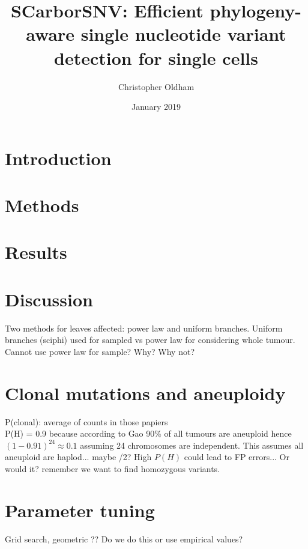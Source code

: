 \documentclass{article}
\title{SCarborSNV: Efficient phylogeny-aware single nucleotide variant detection for single cells}
\author{Christopher Oldham}
\date{January 2019}
\begin{document}
\maketitle


\section{Introduction}


\section{Methods}


\section{Results}
\section{Discussion}

Two methods for leaves affected: power law and uniform branches. Uniform branches (sciphi) used for sampled vs power law for considering whole tumour. Cannot use power law for sample? Why? Why not?









\newpage
{}
%


\newpage
\appendix
\section{Clonal mutations and aneuploidy}
P(clonal): average of counts in those papiers\\
P(H) = 0.9 because according to Gao 90\% of all tumours are aneuploid hence $(1-0.91)^{24}\approx 0.1$ assuming 24 chromosomes are independent. This assumes all aneuploid are haplod... maybe /2? High $P(H)$ could lead to FP errors... Or would it? remember we want to find homozygous variants.
\section{Parameter tuning}
Grid search, geometric ?? Do we do this or use empirical values?
\end{document}
